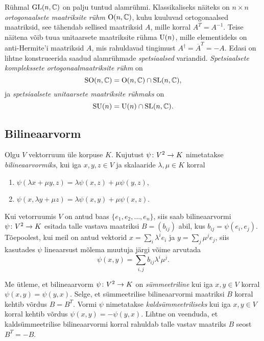 Rühmal $\operatorname{GL}(n, \mathbb{C})$ on palju tuntud alamrühmi. Klassikaliseks näiteks on
$n \times n$ \emph{ortogonaalsete maatriksite rühm} $\operatorname{O}(n, \mathbb{C})$, kuhu kuuluvad
ortogonaalsed maatriksid, see tähendab sellised maatriksid $A$, mille korral
$A^T = A^{-1}$. Teise näitena võib tuua unitaarsete maatriksite rühma $\operatorname{U}(n)$,
mille elementideks on anti-Hermite'i maatriksid $A$, mis rahuldavad tingimust
$A^\dag = \overline{A}^T = -A$. Edasi on lihtne konstrueerida saadud alamrühmade
\emph{spetsiaalsed} variandid. \emph{Spetsiaalsete komplekssete ortogonaalmaatriksite rühm} on
\[ \operatorname{SO}(n, \mathbb{C}) = \operatorname{O}(n, \mathbb{C}) \cap \operatorname{SL}(n, \mathbb{C}), \]
ja \emph{spetsiaalsete unitaarsete maatriksite rühmaks} on
\[ \operatorname{SU}(n) = \operatorname{U}(n) \cap \operatorname{SL}(n, \mathbb{C}). \]

\subsection{Bilineaarvorm}

\begin{dfn}
    Olgu $V$ vektorruum üle korpuse $K$. Kujutust $\psi \colon V^2 \to K$
    nimetatakse \emph{bilineaarvormiks}, kui iga $x, y, z \in V$
    ja skalaaride $\lambda, \mu \in K$ korral
    \begin{enumerate}[label=\roman*.]
        \item $\psi(\lambda x + \mu y, z) = \lambda \psi(x, z) + \mu \psi(y, z)$,
        \item $\psi(x, \lambda y + \mu z) = \lambda \psi(x, y) + \mu \psi(x, z)$.
    \end{enumerate}
\end{dfn}

Kui vetorruumis $V$ on antud baas $\{e_1, e_2, \dots, e_n\}$, siis saab
bilineaarvormi $\psi \colon V^2 \to K$ esitada talle vastava maatriksi
$B = (b_{ij})$ abil, kus $b_{ij} = \psi(e_i, e_j)$. Tõepoolest, kui
meil on antud vektorid $x = \sum_i \lambda^i e_i$ ja $y = \sum_j \mu^j e_j$,
siis kasutades $\psi$ lineaarsust mõlema muutuja järgi võime arvutada
\[ \psi(x, y) = \sum_{i, j} b_{ij} \lambda^i \mu^j. \]

Me ütleme, et bilineaarvorm $\psi \colon V^2 \to K$ on \emph{sümmeetriline} kui
iga $x, y \in V$ korral $\psi(x, y) = \psi(y, x)$. Selge, et sümmeetrilise
bilineaarvormi maatriksi $B$ korral kehtib võrdus $B = B^T$. Vormi $\psi$
nimetatakse \emph{kaldsümmeetriliseks} kui iga $x, y \in V$ korral kehtib
võrdus $\psi(x, y) = - \psi(y, x)$. Lihtne on veenduda, et kaldsümmeetrilise
bilineaarvormi korral rahuldab talle vastav maatriks $B$ seost
$B^T = -B$.

